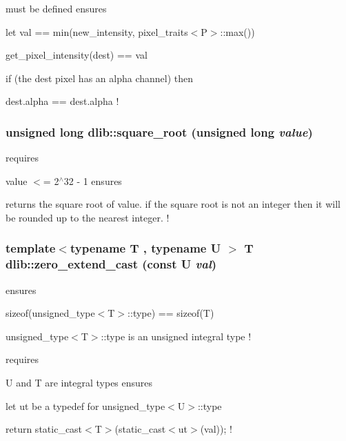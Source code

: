must be defined ensures
\begin{DoxyItemize}
\item let val == min(new\_\-intensity, pixel\_\-traits$<$P$>$::max())
\item get\_\-pixel\_\-intensity(dest) == val
\item if (the dest pixel has an alpha channel) then
\begin{DoxyItemize}
\item dest.alpha == dest.alpha ! 
\end{DoxyItemize}
\end{DoxyItemize}\hypertarget{namespacedlib_aa718d15067f15dd851a98eb1088131ae}{
\subsubsection[{square\_\-root}]{\setlength{\rightskip}{0pt plus 5cm}unsigned long dlib::square\_\-root (unsigned long {\em value})}}
\label{namespacedlib_aa718d15067f15dd851a98eb1088131ae}
requires
\begin{DoxyItemize}
\item value $<$= 2$^\wedge$32 -\/ 1 ensures
\item returns the square root of value. if the square root is not an integer then it will be rounded up to the nearest integer. ! 
\end{DoxyItemize}\hypertarget{namespacedlib_a87847cba5edee8c23c0970bbe19fa3ce}{
\subsubsection[{zero\_\-extend\_\-cast}]{\setlength{\rightskip}{0pt plus 5cm}template$<$typename T , typename U $>$ T dlib::zero\_\-extend\_\-cast (const U {\em val})}}
\label{namespacedlib_a87847cba5edee8c23c0970bbe19fa3ce}
ensures
\begin{DoxyItemize}
\item sizeof(unsigned\_\-type$<$T$>$::type) == sizeof(T)
\item unsigned\_\-type$<$T$>$::type is an unsigned integral type !
\end{DoxyItemize}

requires
\begin{DoxyItemize}
\item U and T are integral types ensures
\item let ut be a typedef for unsigned\_\-type$<$U$>$::type
\item return static\_\-cast$<$T$>$(static\_\-cast$<$ut$>$(val)); ! 
\end{DoxyItemize}